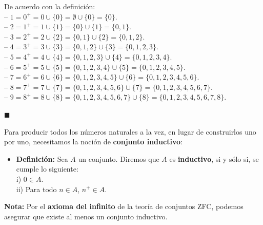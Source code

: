 \documentclass[10 pt]{article}
\begin{document}
\Large{De acuerdo con la definición: \\

-- $1=0^+=0 \cup \{0\}=\emptyset \cup \{0\}=\{0\}$. \\

-- $2=1^+=1 \cup \{1\}=\{0\} \cup \{1\}=\{0,1\}$. \\

-- $3=2^+=2 \cup \{2\}=\{0,1\} \cup \{2\}=\{0,1,2\}$. \\

-- $4=3^+=3 \cup \{3\}=\{0,1,2\} \cup \{3\}=\{0,1,2,3\}$. \\

-- $5=4^+=4 \cup \{4\}=\{0,1,2,3\} \cup \{4\}=\{0,1,2,3,4\}$. \\

-- $6=5^+=5 \cup \{5\}=\{0,1,2,3,4\} \cup \{5\}=\{0,1,2,3,4,5\}$. \\

-- $7=6^+=6 \cup \{6\}=\{0,1,2,3,4,5\} \cup \{6\}=\{0,1,2,3,4,5,6\}$. \\

-- $8=7^+=7 \cup \{7\}=\{0,1,2,3,4,5,6\} \cup \{7\}=\{0,1,2,3,4,5,6,7\}$. \\

-- $9=8^+=8 \cup \{8\}=\{0,1,2,3,4,5,6,7\} \cup \{8\}=\{0,1,2,3,4,5,6,7,8\}$. \\

\begin{flushright}
    $\blacksquare$
\end{flushright}

\Large{Para producir todos los números naturales a la vez, en lugar de construirlos uno por uno, necesitamos la noción de \textbf{conjunto inductivo}:} \\

\begin{itemize}
    \item \Large{\textbf{Definición:} Sea $A$ un conjunto. Diremos que $A$ es \textbf{inductivo}, si y sólo si, se cumple lo siguiente: \\

    i) $0 \in A$. \\

    ii) Para todo $n \in A$, $n^+ \in A$.} \\
\end{itemize}

\Large{\textbf{Nota:} Por el \textbf{axioma del infinito} de la teoría de conjuntos ZFC, podemos asegurar que existe al menos un conjunto inductivo.} \\

}
\end{document}
